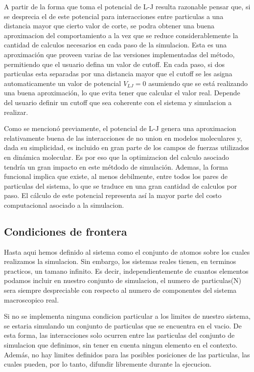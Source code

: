 \documentclass[a4paper,10pt]{report}
\begin{document}
A partir de la forma que toma el potencial de L-J resulta razonable pensar que, si se desprecia el de este potencial para interacciones entre particulas a una distancia mayor que cierto valor de corte, se podra obtener una buena aproximacion del comportamiento a la vez que se reduce considerablemente la cantidad de calculos necesarios en cada paso de la simulacion.
Esta es una aproximación que proveen varias de las versiones implementadas del método, permitiendo que el usuario defina un valor de cutoff. 
En cada paso, si dos particulas esta separadas por una distancia mayor que el cutoff se les asigna automaticamente un valor de potencial $V_{LJ}=0$ asumiendo que se está realizando una buena aproximación, lo que evita tener que calcular el valor real. 
Depende del usuario definir un cutoff que sea coherente con el sistema y simulacion a realizar.

Como se mencionó previamente, el potencial de L-J genera una aproximacion relativamente buena de las interacciones de no union en modelos moleculares y, dada su simplicidad, es incluido en gran parte de los campos de fuerzas utilizados en dinámica molecular.
Es por eso que la optimizacion del calculo asociado tendría un gran impacto en este métdodo de simulación. Ademas, la forma funcional implica que existe, al menos debilmente, entre todos los pares de particulas del sistema, lo que se traduce en una gran cantidad de calculos por paso. 
El cálculo de este potencial representa así la mayor parte del costo computacional asociado a la simulacion. 


\subsection{Condiciones de frontera}

Hasta aqui hemos definido al sistema como el conjunto de atomos sobre los cuales realizamos la simulacion. 
Sin embargo, los sistemas reales tienen, en terminos practicos, un tamano infinito. 
Es decir, independientemente de cuantos elementos podamos incluir en nuestro conjunto de simulacion, el numero de particulas(N) sera siempre despreciable con respecto al numero de componentes del sistema macroscopico real.

Si no se implementa ninguna condicion particular a los limites de nuestro sistema, se estaria simulando un conjunto de particulas que se encuentra en el vacio. 
De esta forma, las interacciones solo ocurren entre las particulas del conjunto de simulacion que definimos, sin tener en cuenta ningun elemento en el contexto.
Además, no hay limites definidos para las posibles posiciones de las particulas, las cuales pueden, por lo tanto, difundir libremente durante la ejecucion.
\end{document}
